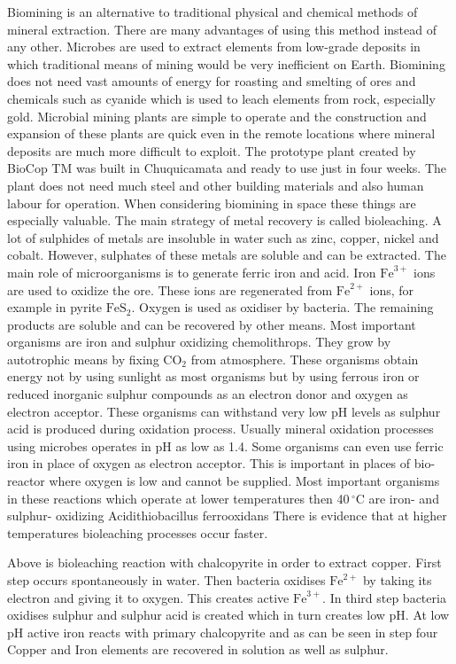 \documentclass[12pt]{article}
\begin{document}
Biomining is an alternative to traditional physical and chemical methods of mineral extraction. There are many advantages of using this method instead of any other. Microbes are used to extract elements from low-grade deposits in which traditional means of mining would be very inefficient on Earth. Biomining does not need vast amounts of energy for roasting and smelting of ores and chemicals such as cyanide which is used to leach elements from rock, especially
gold. Microbial mining plants are simple to operate and the construction and expansion of these plants are quick even in the remote locations where mineral deposits are much more difficult to exploit. The prototype plant created by BioCop TM was built in Chuquicamata and ready to use just in four weeks. The plant does not need much steel and other building materials and also
human labour for operation. When considering biomining in space these things are especially valuable. The main strategy of metal recovery is called bioleaching. A lot of sulphides of metals are insoluble in water such as zinc, copper, nickel and cobalt. However, sulphates of these metals are soluble and can be extracted. The main role of microorganisms is to generate ferric iron and acid. Iron $\mathrm{Fe}^{3+}$ ions are used to oxidize the ore. These ions are regenerated from $\mathrm{Fe}^{2+}$
ions, for example in pyrite $\mathrm{FeS}_{2}$. Oxygen is used as oxidiser by bacteria. The remaining products are soluble and can be recovered by other means. Most important organisms are iron and sulphur oxidizing chemolithrops. They grow by autotrophic means by fixing $\mathrm{CO}_2$ from atmosphere. These organisms obtain energy not by using sunlight as most organisms but by using ferrous iron or reduced inorganic sulphur compounds as an electron donor and oxygen as electron acceptor. These organisms can withstand very low pH levels as sulphur acid is produced during oxidation process. Usually mineral oxidation processes using microbes operates in pH as low as 1.4.\cite{} Some organisms can even use ferric iron in place of oxygen as electron acceptor. This is important in places of bio-reactor where oxygen is low and cannot be supplied. Most important organisms in these reactions which operate at lower temperatures then 40$\,^{\circ}\mathrm{C}$ are iron- and sulphur- oxidizing Acidithiobacillus ferrooxidans There is evidence that at higher temperatures bioleaching processes occur faster.\cite{}


Above is bioleaching reaction with chalcopyrite in order to extract copper. First step occurs spontaneously in water. Then bacteria oxidises $\mathrm{Fe}^{2+}$ by taking its electron and giving it to
oxygen. This creates active $\mathrm{Fe}^{3+}$. In third step bacteria oxidises sulphur and sulphur acid is created which in turn creates low pH. At low pH active iron reacts with primary chalcopyrite and as can be seen in step four Copper and Iron elements are recovered in solution as well as sulphur.
\end{document}
